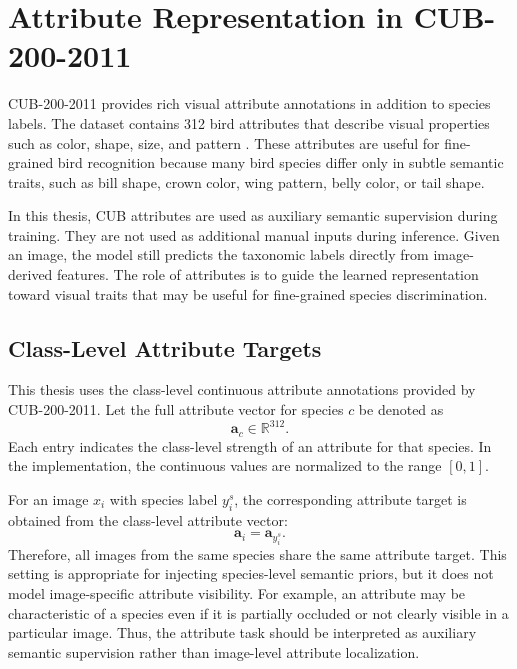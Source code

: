 \section{Attribute Representation in CUB-200-2011}

CUB-200-2011 provides rich visual attribute annotations in addition to species labels. The dataset contains 312 bird attributes that describe visual properties such as color, shape, size, and pattern \cite{wah2011cub}. These attributes are useful for fine-grained bird recognition because many bird species differ only in subtle semantic traits, such as bill shape, crown color, wing pattern, belly color, or tail shape.

In this thesis, CUB attributes are used as auxiliary semantic supervision during training. They are not used as additional manual inputs during inference. Given an image, the model still predicts the taxonomic labels directly from image-derived features. The role of attributes is to guide the learned representation toward visual traits that may be useful for fine-grained species discrimination.

\subsection{Class-Level Attribute Targets}

This thesis uses the class-level continuous attribute annotations provided by CUB-200-2011. Let the full attribute vector for species \(c\) be denoted as
\begin{equation}
    \mathbf{a}_c \in \mathbb{R}^{312}.
\end{equation}
Each entry indicates the class-level strength of an attribute for that species. In the implementation, the continuous values are normalized to the range \([0,1]\).

For an image \(x_i\) with species label \(y_i^s\), the corresponding attribute target is obtained from the class-level attribute vector:
\begin{equation}
    \mathbf{a}_i = \mathbf{a}_{y_i^s}.
\end{equation}
Therefore, all images from the same species share the same attribute target. This setting is appropriate for injecting species-level semantic priors, but it does not model image-specific attribute visibility. For example, an attribute may be characteristic of a species even if it is partially occluded or not clearly visible in a particular image. Thus, the attribute task should be interpreted as auxiliary semantic supervision rather than image-level attribute localization.

